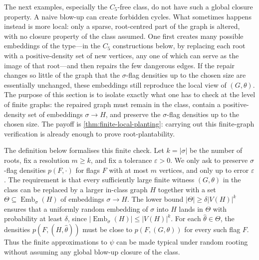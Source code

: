 \documentclass[11pt]{article}
\theoremstyle{definition}
\newcommand{\Emb}{\operatorname{Emb}}
\newcommand{\eps}{\varepsilon}
\begin{document}
The next examples, especially the $C_5$-free class, do not have such a global closure
property.  A naive blow-up can create forbidden cycles.  What sometimes happens instead
is more local: only a sparse, root-centred part of the graph is altered, with no closure
property of the class assumed.  One first creates many possible embeddings of the
type---in the $C_5$ constructions below, by replacing each root with a positive-density set
of new vertices, any one of which can serve as the image of that root---and then repairs the
few dangerous edges.  If the repair changes so little of the graph that the $\sigma$-flag densities up to the
chosen size are essentially unchanged, these embeddings still reproduce the local view of
$(G,\theta)$.  The purpose of this section is to isolate
exactly what one has to check at the level of finite graphs: the repaired graph must
remain in the class, contain a positive-density set of embeddings $\sigma\to H$, and
preserve the $\sigma$-flag densities up to the chosen size.  The payoff is
\cref{thm:finite-local-planting}: carrying out this finite-graph verification is already
enough to prove root-plantability.

The definition below formalises this finite check.  Let $k=|\sigma|$ be the number of
roots, fix a resolution $m\ge k$, and fix a tolerance $\eps>0$.  We only ask
to preserve $\sigma$-flag densities $p(F,\cdot)$ for flags $F$ with at most $m$ vertices,
and only up to error $\eps$.  The requirement is that every sufficiently large finite
witness $(G,\theta)$ in the class can be replaced by a larger in-class graph $H$ together
with a set $\Theta\subseteq\Emb_\sigma(H)$ of embeddings $\sigma\to H$.  The
lower bound $|\Theta|\ge\delta |V(H)|^k$ ensures that a uniformly random embedding
of $\sigma$ into $H$ lands in $\Theta$ with probability at least $\delta$, since
$|\Emb_\sigma(H)|\le |V(H)|^k$.  For each $\widehat\theta\in\Theta$, the densities
$p(F,(H,\widehat\theta))$ must be close to $p(F,(G,\theta))$ for every such flag $F$.
Thus the finite approximations to $\psi$ can be made typical under random rooting
without assuming any global blow-up closure of the class.
\end{document}
